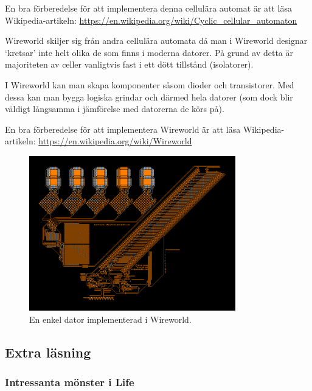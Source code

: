 En bra förberedelse för att implementera denna cellulära automat är att läsa Wikipedia-artikeln: \url{https://en.wikipedia.org/wiki/Cyclic_cellular_automaton}


Wireworld skiljer sig från andra cellulära automata då man i Wireworld designar `kretsar' inte helt olika de som finns i moderna datorer.
På grund av detta är majoriteten av celler vanligtvis fast i ett dött tillstånd (isolatorer).

I Wireworld kan man skapa komponenter såsom dioder och transistorer. Med dessa kan man bygga logiska grindar och därmed hela datorer (som dock blir väldigt långsamma i jämförelse med datorerna de körs på).

En bra förberedelse för att implementera Wireworld är att läsa Wikipedia-artikeln: \url{https://en.wikipedia.org/wiki/Wireworld}

\begin{figure}[h]
    \begin{center}
        \includegraphics[width=0.8\textwidth]{../img/w12-lab/wireworld_computer.png}
    \end{center}
    \caption{En enkel dator implementerad i Wireworld.\protect\footnotemark}
    \label{fig:threads:life:wireworld-computer}
\end{figure}


\subsection{Extra läsning}

\subsubsection{Intressanta mönster i Life}

